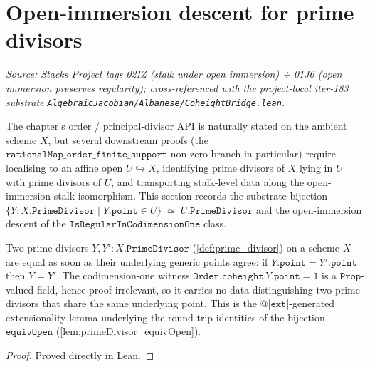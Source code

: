 \section{Open-immersion descent for prime divisors}
\label{sec:open_immersion_descent}
\textit{Source: Stacks Project tags 02IZ (stalk under open immersion) +
01J6 (open immersion preserves regularity); cross-referenced with the
project-local iter-183 substrate
\texttt{AlgebraicJacobian/Albanese/CoheightBridge.lean}.}

The chapter's order / principal-divisor API is naturally stated on the
ambient scheme \(X\), but several downstream proofs (the
\(\texttt{rationalMap\_order\_finite\_support}\) non-zero branch in
particular) require localising to an affine open \(U \hookrightarrow X\),
identifying prime divisors of \(X\) lying in \(U\) with prime divisors of
\(U\), and transporting stalk-level data along the open-immersion stalk
isomorphism. This section records the substrate bijection
\(\{Y : X.\texttt{PrimeDivisor} \mid Y.\texttt{point} \in U\}
 \;\simeq\; U.\texttt{PrimeDivisor}\)
and the open-immersion descent of the \(\texttt{IsRegularInCodimensionOne}\)
class.

\begin{lemma}

  \label{lem:primeDivisor_ext}
  Two prime divisors \(Y, Y' : X.\texttt{PrimeDivisor}\)
  (\ref{def:prime_divisor}) on a scheme \(X\) are equal as soon as their
  underlying generic points agree: if \(Y.\texttt{point} = Y'.\texttt{point}\)
  then \(Y = Y'\). The codimension-one witness
  \(\texttt{Order.coheight}\,Y.\texttt{point} = 1\) is a \(\texttt{Prop}\)-valued
  field, hence proof-irrelevant, so it carries no data distinguishing two prime
  divisors that share the same underlying point. This is the
  \(\texttt{@[ext]}\)-generated extensionality lemma underlying the round-trip
  identities of the bijection \(\texttt{equivOpen}\)
  (\ref{lem:primeDivisor_equivOpen}).
\end{lemma}
\begin{proof}
  Proved directly in Lean.
\end{proof}

